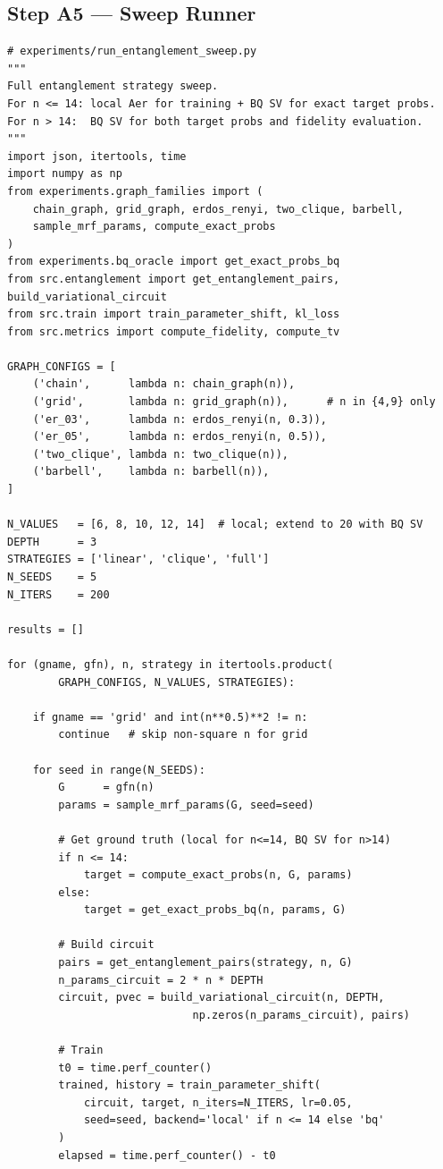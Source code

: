 \documentclass[11pt]{article}
\begin{document}
\subsection{Step A5 --- Sweep Runner}

\begin{lstlisting}
# experiments/run_entanglement_sweep.py
"""
Full entanglement strategy sweep.
For n <= 14: local Aer for training + BQ SV for exact target probs.
For n > 14:  BQ SV for both target probs and fidelity evaluation.
"""
import json, itertools, time
import numpy as np
from experiments.graph_families import (
    chain_graph, grid_graph, erdos_renyi, two_clique, barbell,
    sample_mrf_params, compute_exact_probs
)
from experiments.bq_oracle import get_exact_probs_bq
from src.entanglement import get_entanglement_pairs, build_variational_circuit
from src.train import train_parameter_shift, kl_loss
from src.metrics import compute_fidelity, compute_tv

GRAPH_CONFIGS = [
    ('chain',      lambda n: chain_graph(n)),
    ('grid',       lambda n: grid_graph(n)),      # n in {4,9} only
    ('er_03',      lambda n: erdos_renyi(n, 0.3)),
    ('er_05',      lambda n: erdos_renyi(n, 0.5)),
    ('two_clique', lambda n: two_clique(n)),
    ('barbell',    lambda n: barbell(n)),
]

N_VALUES   = [6, 8, 10, 12, 14]  # local; extend to 20 with BQ SV
DEPTH      = 3
STRATEGIES = ['linear', 'clique', 'full']
N_SEEDS    = 5
N_ITERS    = 200

results = []

for (gname, gfn), n, strategy in itertools.product(
        GRAPH_CONFIGS, N_VALUES, STRATEGIES):

    if gname == 'grid' and int(n**0.5)**2 != n:
        continue   # skip non-square n for grid

    for seed in range(N_SEEDS):
        G      = gfn(n)
        params = sample_mrf_params(G, seed=seed)

        # Get ground truth (local for n<=14, BQ SV for n>14)
        if n <= 14:
            target = compute_exact_probs(n, G, params)
        else:
            target = get_exact_probs_bq(n, params, G)

        # Build circuit
        pairs = get_entanglement_pairs(strategy, n, G)
        n_params_circuit = 2 * n * DEPTH
        circuit, pvec = build_variational_circuit(n, DEPTH,
                             np.zeros(n_params_circuit), pairs)

        # Train
        t0 = time.perf_counter()
        trained, history = train_parameter_shift(
            circuit, target, n_iters=N_ITERS, lr=0.05,
            seed=seed, backend='local' if n <= 14 else 'bq'
        )
        elapsed = time.perf_counter() - t0


\end{lstlisting}
\end{document}
